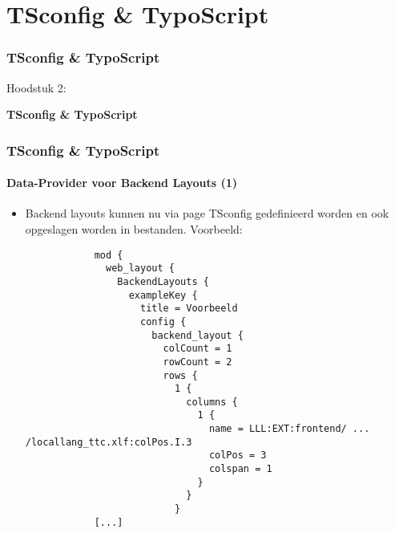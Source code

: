 %

\section{TSconfig \& TypoScript}
\begin{frame}[fragile]
	\frametitle{TSconfig \& TypoScript}

	\begin{center}\huge{Hoodstuk 2:}\end{center}
	\begin{center}\huge{\color{typo3darkgrey}\textbf{TSconfig \& TypoScript}}\end{center}

\end{frame}

\begin{frame}[fragile]
	\frametitle{TSconfig \& TypoScript}
	\framesubtitle{Data-Provider voor Backend Layouts (1)}

	\lstset{basicstyle=\tiny\ttfamily}

	\begin{itemize}
		\item Backend layouts kunnen nu via page TSconfig gedefinieerd worden en ook opgeslagen worden in bestanden. Voorbeeld:

		\begin{lstlisting}
			mod {
			  web_layout {
			    BackendLayouts {
			      exampleKey {
			        title = Voorbeeld
			        config {
			          backend_layout {
			            colCount = 1
			            rowCount = 2
			            rows {
			              1 {
			                columns {
			                  1 {
			                    name = LLL:EXT:frontend/ ... /locallang_ttc.xlf:colPos.I.3
			                    colPos = 3
			                    colspan = 1
			                  }
			                }
			              }
			[...]
		\end{lstlisting}

	\end{itemize}

\end{frame}

